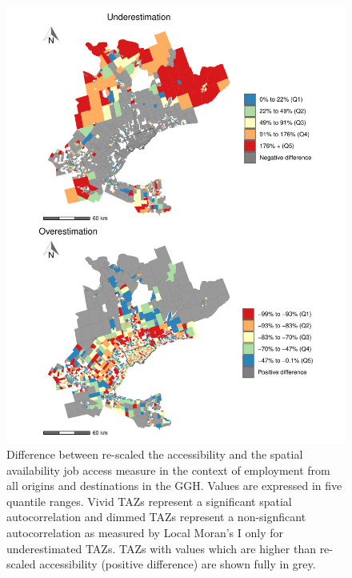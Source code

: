 \documentclass[]{elsarticle} %
\begin{document}
\begin{figure}
\includegraphics[width=1\linewidth]{Spatial-Availability_files/figure-latex/plot-difference-GGH-1} \caption{\label{fig:plot-difference-GGH}Difference between re-scaled the accessibility and the spatial availability job access measure in the context of employment from all origins and destinations in the GGH. Values are expressed in five quantile ranges. Vivid TAZs represent a significant spatial autocorrelation and dimmed TAZs represent a non-signficant autocorrelation as measured by Local Moran's I only for underestimated TAZs. TAZs with values which are higher than re-scaled accessibility (positive difference) are shown fully in grey.}\label{fig:plot-difference-GGH}
\end{figure}
\end{document}
